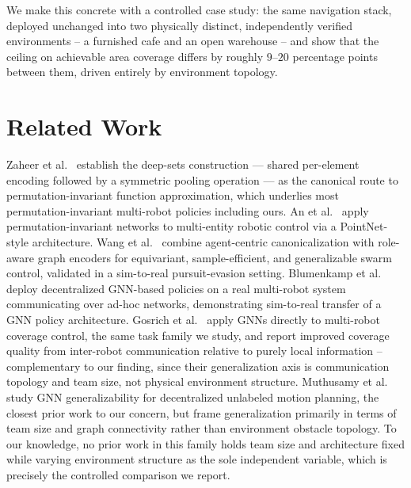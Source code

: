 \documentclass[12pt]{article}
\begin{document}
We make this concrete with a controlled case study: the same navigation
stack, deployed unchanged into two physically distinct, independently
verified environments -- a furnished cafe and an open warehouse -- and show
that the ceiling on achievable area coverage differs by roughly $9$--$20$
percentage points between them, driven entirely by environment topology.

\section{Related Work}
Zaheer et al.~\cite{zaheer2017deepsets} establish the deep-sets construction
--- shared per-element encoding followed by a symmetric pooling operation ---
as the canonical route to permutation-invariant function approximation, which
underlies most permutation-invariant multi-robot policies including ours. An
et al.~\cite{multientitypinn2024} apply permutation-invariant networks to
multi-entity robotic control via a PointNet-style architecture. Wang et
al.~\cite{localcanon2025} combine agent-centric canonicalization with
role-aware graph encoders for equivariant, sample-efficient, and
generalizable swarm control, validated in a sim-to-real pursuit-evasion
setting. Blumenkamp et al.~\cite{gnnrealworld2021} deploy decentralized
GNN-based policies on a real multi-robot system communicating over ad-hoc
networks, demonstrating sim-to-real transfer of a GNN policy architecture.
Gosrich et al.~\cite{gosrich2022coverage} apply GNNs directly to multi-robot
coverage control, the same task family we study, and report improved
coverage quality from inter-robot communication relative to purely local
information -- complementary to our finding, since their generalization axis
is communication topology and team size, not physical environment structure.
Muthusamy et al.~\cite{gnngeneralizability2024} study GNN generalizability
for decentralized unlabeled motion planning, the closest prior work to our
concern, but frame generalization primarily in terms of team size and graph
connectivity rather than environment obstacle topology. To our knowledge, no
prior work in this family holds team size and architecture fixed while
varying environment structure as the sole independent variable, which is
precisely the controlled comparison we report.
\end{document}
